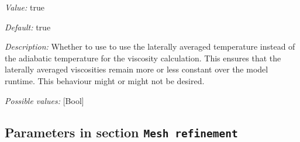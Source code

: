 \begin{itemize}
{\it Value:} true


{\it Default:} true


{\it Description:} Whether to use to use the laterally averaged temperature instead of the adiabatic temperature for the viscosity calculation. This ensures that the laterally averaged viscosities remain more or less constant over the model runtime. This behaviour might or might not be desired.


{\it Possible values:} [Bool]
\end{itemize}

\subsection{Parameters in section \tt Mesh refinement}
\label{parameters:Mesh_20refinement}


